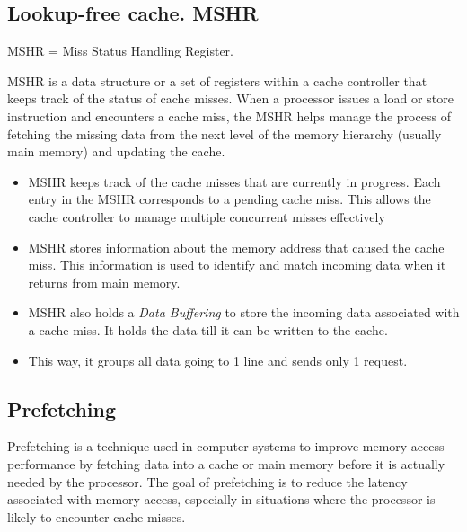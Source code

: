 \documentclass[letterpaper,12pt]{article}
\begin{document}
\subsection{Lookup-free cache. MSHR}
MSHR = Miss Status Handling Register.

MSHR is a data structure or a set of registers within a cache controller that keeps track of the status of cache misses. When a processor issues a load or store instruction and encounters a cache miss, the MSHR helps manage the process of fetching the missing data from the next level of the memory hierarchy (usually main memory) and updating the cache.

\begin{itemize}
    \item MSHR keeps track of the cache misses that are currently in progress. Each entry in the MSHR corresponds to a pending cache miss. This allows the cache controller to manage multiple concurrent misses effectively
    \item MSHR stores information about the memory address that caused the cache miss. This information is used to identify and match incoming data when it returns from main memory.
    \item MSHR also holds a \textit{Data Buffering} to store the incoming data associated with a cache miss. It holds the data till it can be written to the cache.
    \item This way, it groups all data going to 1 line and sends only 1 request.
\end{itemize}

\subsection{Prefetching}

Prefetching is a technique used in computer systems to improve memory access performance by fetching data into a cache or main memory before it is actually needed by the processor. The goal of prefetching is to reduce the latency associated with memory access, especially in situations where the processor is likely to encounter cache misses.
\end{document}
